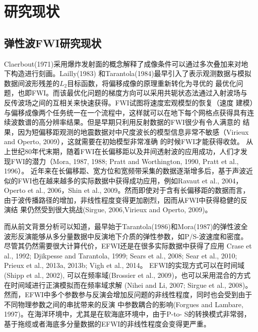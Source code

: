 \section{研究现状}
\subsection{弹性波FWI研究现状}
Claerbout(1971\cite{Claerbout1971})采用爆炸发射面的概念解释了成像条件可以通过多次叠加来对地下构造进行刻画。Lailly(1983\cite{lailly1983seismic})
和Tarantola(1984\cite{tarantola1984})最早引入了表示观测数据与模拟数据间波形残差的$L_2$目标函数，将偏移成像的原理重新转化为寻优的
最优化问题，也即FWI。而该最优化问题的梯度方向可以采用共轭状态法通过入射波场与反传波场之间的互相关来快速获得。FWI试图将速度宏观模型的恢复（速度
建模）与偏移成像两个任务统一在一个流程中，这样就可以在地下每个网格点获得具有连续波数谱的高分辨率结果。但是早期只利用反射数据的FWI很少有令人满意的
结果，因为短偏移距观测的地震数据对中尺度波长的模型信息非常不敏感（Virieux and Operto, 2009\cite{virieux2009overview}），这就需要在初始模型非常准确
的时候FWI才能获得收敛。
从上世纪80年代末期，随着FWI在长偏移距以及井间透射波的应用成功，人们才发现FWI的潜力（Mora, 1987\cite{mora:1987}, 1988\cite{mora1988elastic}; Pratt
and Worthington, 1990\cite{PRATTEtAl1990}, Pratt et al., 1996\cite{pratt1996two}）。
近年来在长偏移距、宽方位和宽频带采集的数据逐渐增多后，基于声波近似的FWI也在越来越多的实际数据中获得成功应用，例如Ravaut
et al., 2004\cite{RavautEtAl2004}，Operto et al., 2006\cite{Operto2006}，Shin et al.,
2009\cite{ShinEtAl2009}。然而即使对于含有长偏移距的数据而言，由于波传播路径的增加，非线性程度变得更加剧烈，因而从FWI中获得稳健的反演结
果仍然受到很大挑战(Sirgue, 2006\cite{sirgue2006importance},Virieux and Operto,
2009\cite{virieux2009overview})。

而从前文背景分析可以知道，最早始于Tarantola(1986)\cite{tarantola:1986}和Mora(1987)\cite{mora:1987}的弹性波全波形反演能够从多分量数据中反演地下介质的弹性参数，如P/S-波速度和密度。
尽管其仍然需要很大计算代价，EFWI还是在很多实际数据中获得了应用
Crase et al., 1992\cite{crase1992nonlinear}; Djikpesse and Tarantola,
1999\cite{djikpesse.tarantola:1999}; Sears et al., 2008\cite{sears2008}; Sear et al.,
2010\cite{sears:2010}; Prieux et al., 2013a\cite{prieux:2013a}, 2013b\cite{prieux:2013b}; Vigh et al.,
2014\cite{vigh:2014}。
EFWI的实现方式可以在时间域(Shipp et al., 2002\cite{shipp:2002}),
可以在频率域(Brossier et al., 2009\cite{brossier2009})，也可以采用混合的方式在时间域进行正演模拟而在频率域求解
(Nihei and Li, 2007\cite{nihei.li:2007}; Sirgue et al.,
2008\cite{sirgue:2008})。然而，EFWI中多个参数参与反演会增加反问题的非线性程度，同时也会受到由于不同物理参数之间的串扰带来的反演
中参数耦合的影响(Forgues and Lambare, 1997\cite{forgues.lambare:1997})。在海洋环境中，尤其是在软海底环境中，由于P-to-
S的转换模式非常弱，基于拖缆或者海底多分量数据的EFWI的非线性程度会变得更严重\cite{sears2008}。


